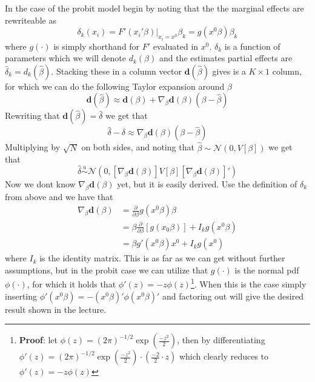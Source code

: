 In the case of the probit model begin by noting that the the marginal effects are rewriteable as
\begin{equation}
\delta_k(x_i) = F'(x_i'\beta)|_{x_i = x^0}\beta_k = g(x^0\beta)\beta_k
\end{equation}
where $g(\cdot)$ is simply shorthand for $F'$ evaluated in $x^0$. $\delta_k$ is a function of parameters which we will denote $d_k(\beta)$ and the estimates partial effects are $\hat{\delta}_k = d_k(\hat{\beta})$. Stacking these in a column vector $\textbf{d}(\hat{\beta})$ gives is a $K\times 1$ column, for which we can do the following Taylor expansion around $\beta$
\begin{equation}
  \textbf{d}(\hat{\beta}) \approx \textbf{d}(\beta) + \nabla_{\beta}   \textbf{d}(\beta)(\beta - \hat{\beta})
\end{equation}
Rewriting that $\textbf{d}(\hat{\beta}) = \hat{\delta}$ we get that
\begin{equation}
  \hat{\delta} - \delta \approx \nabla_{\beta}   \textbf{d}(\beta)(\beta - \hat{\beta})
\end{equation}
Multiplying by $\sqrt{N}$ on both sides, and noting that $\hat{\beta}\sim \mathcal{N}(0,V[\beta])$ we get that
\begin{equation}
  \hat{\delta} \overset{a}{\sim} \mathcal{N}(0, [\nabla_{\beta}   \textbf{d}(\beta)]V[\beta][\nabla_{\beta}   \textbf{d}(\beta)]')
\end{equation}
Now we dont know $\nabla_{\beta} \textbf{d}(\beta)$ yet, but it is easily derived. Use the definition of $\delta_k$ from above and we have that
\begin{align*}
  \nabla_{\beta} \textbf{d}(\beta) &= \frac{\partial}{\partial \beta} g(x^0\beta) \beta \\
  & = \beta \frac{\partial}{\partial \beta} \left[
g(x_0\beta)
  \right] +
I_k  g(x^0\beta) \\
  &= \beta g'(x^0\beta)x^0 + I_k g(x^0)
\end{align*}
where $I_k$ is the identity matrix. This is as far as we can get without further assumptions, but in the probit case we can utilize that $g(\cdot)$ is the normal pdf $\phi(\cdot)$, for which it holds that $\phi'(z)=-z\phi(z)$\footnote{\textbf{Proof}: let $\phi(z)=(2\pi)^{-1/2}\exp(\frac{-z^2}{2} )$, then by differentiating $\phi'(z)= (2\pi)^{-1/2}\exp(\frac{-z^2}{2})\cdot \left(\frac{-2}{2}\cdot z \right)$ which clearly reduces to $\phi'(z)=-z\phi(z)$}. When this is the case simply inserting $\phi'(x^0\beta)=-(x^0\beta)'\phi(x^0\beta)'$ and factoring out will give the desired result shown in the lecture.
